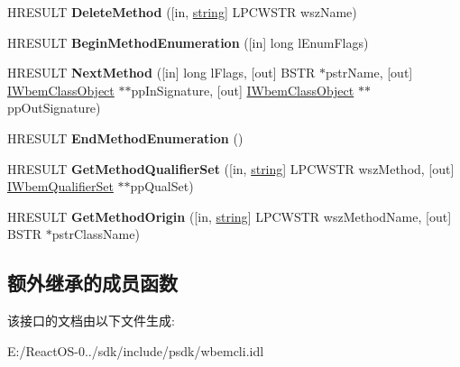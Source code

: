 \begin{DoxyCompactItemize}
\item 
\mbox{\label{interface_i_wbem_class_object_a15dbae40fc9972fd31b42ec20199f923}} 
H\+R\+E\+S\+U\+LT {\bfseries Delete\+Method} (\mbox{[}in, \hyperlink{structstring}{string}\mbox{]} L\+P\+C\+W\+S\+TR wsz\+Name)
\item 
\mbox{\label{interface_i_wbem_class_object_aada13d0aaab91df69dd044289d59992d}} 
H\+R\+E\+S\+U\+LT {\bfseries Begin\+Method\+Enumeration} (\mbox{[}in\mbox{]} long l\+Enum\+Flags)
\item 
\mbox{\label{interface_i_wbem_class_object_a26bc865a0d477a18bbdcbaafb426b09d}} 
H\+R\+E\+S\+U\+LT {\bfseries Next\+Method} (\mbox{[}in\mbox{]} long l\+Flags, \mbox{[}out\mbox{]} B\+S\+TR $\ast$pstr\+Name, \mbox{[}out\mbox{]} \hyperlink{interface_i_wbem_class_object}{I\+Wbem\+Class\+Object} $\ast$$\ast$pp\+In\+Signature, \mbox{[}out\mbox{]} \hyperlink{interface_i_wbem_class_object}{I\+Wbem\+Class\+Object} $\ast$$\ast$pp\+Out\+Signature)
\item 
\mbox{\label{interface_i_wbem_class_object_a947583bed75897e21e4321086407edf4}} 
H\+R\+E\+S\+U\+LT {\bfseries End\+Method\+Enumeration} ()
\item 
\mbox{\label{interface_i_wbem_class_object_aef5df6035b3d5aa3b7380c36b3db7f72}} 
H\+R\+E\+S\+U\+LT {\bfseries Get\+Method\+Qualifier\+Set} (\mbox{[}in, \hyperlink{structstring}{string}\mbox{]} L\+P\+C\+W\+S\+TR wsz\+Method, \mbox{[}out\mbox{]} \hyperlink{interface_i_wbem_qualifier_set}{I\+Wbem\+Qualifier\+Set} $\ast$$\ast$pp\+Qual\+Set)
\item 
\mbox{\label{interface_i_wbem_class_object_a0a9034e4508d5d3458f600c16d9b36f0}} 
H\+R\+E\+S\+U\+LT {\bfseries Get\+Method\+Origin} (\mbox{[}in, \hyperlink{structstring}{string}\mbox{]} L\+P\+C\+W\+S\+TR wsz\+Method\+Name, \mbox{[}out\mbox{]} B\+S\+TR $\ast$pstr\+Class\+Name)
\end{DoxyCompactItemize}
\subsection*{额外继承的成员函数}


该接口的文档由以下文件生成\+:\begin{DoxyCompactItemize}
\item 
E\+:/\+React\+O\+S-\/0../sdk/include/psdk/wbemcli.\+idl\end{DoxyCompactItemize}
